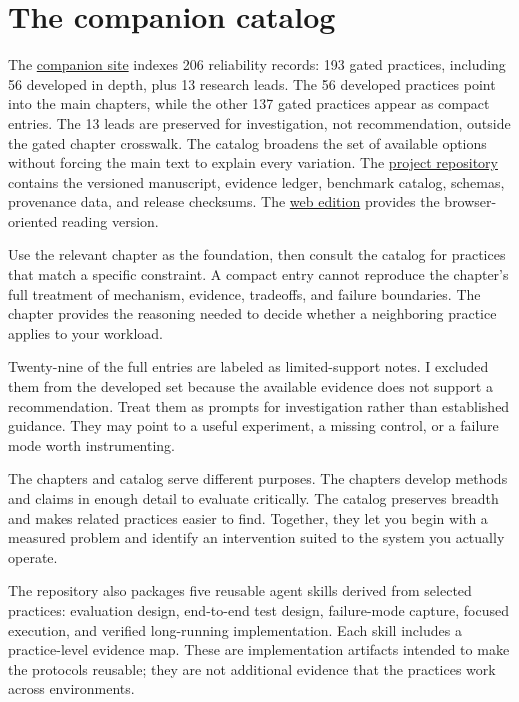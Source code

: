 \hypertarget{the-companion-catalog}{%
\section{The companion catalog}\label{the-companion-catalog}}

The \href{https://sjarmak.ai/books/engineering-reliable-coding-agents/companion}{companion site} indexes 206 reliability records: 193 gated practices, including 56 developed in depth, plus 13 research leads. The 56 developed practices point into the main chapters, while the other 137 gated practices appear as compact entries. The 13 leads are preserved for investigation, not recommendation, outside the gated chapter crosswalk. The catalog broadens the set of available options without forcing the main text to explain every variation. The \href{https://github.com/sjarmak/engineering-reliable-coding-agents}{project repository} contains the versioned manuscript, evidence ledger, benchmark catalog, schemas, provenance data, and release checksums. The \href{https://sjarmak.ai/books/engineering-reliable-coding-agents}{web edition} provides the browser-oriented reading version.

Use the relevant chapter as the foundation, then consult the catalog for practices that match a specific constraint. A compact entry cannot reproduce the chapter's full treatment of mechanism, evidence, tradeoffs, and failure boundaries. The chapter provides the reasoning needed to decide whether a neighboring practice applies to your workload.

Twenty-nine of the full entries are labeled as limited-support notes. I excluded them from the developed set because the available evidence does not support a recommendation. Treat them as prompts for investigation rather than established guidance. They may point to a useful experiment, a missing control, or a failure mode worth instrumenting.

The chapters and catalog serve different purposes. The chapters develop methods and claims in enough detail to evaluate critically. The catalog preserves breadth and makes related practices easier to find. Together, they let you begin with a measured problem and identify an intervention suited to the system you actually operate.

The repository also packages five reusable agent skills derived from selected practices: evaluation design, end-to-end test design, failure-mode capture, focused execution, and verified long-running implementation. Each skill includes a practice-level evidence map. These are implementation artifacts intended to make the protocols reusable; they are not additional evidence that the practices work across environments.

